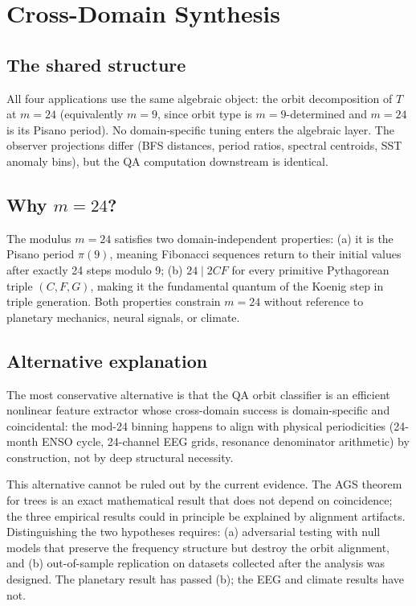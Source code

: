 \documentclass[11pt]{article}
\begin{document}
\section{Cross-Domain Synthesis}\label{sec:synthesis}

\subsection{The shared structure}

All four applications use the same algebraic object: the orbit decomposition
of $T$ at $m=24$ (equivalently $m=9$, since orbit type is $m=9$-determined
and $m=24$ is its Pisano period).  No domain-specific tuning enters the
algebraic layer.  The observer projections differ (BFS distances, period ratios,
spectral centroids, SST anomaly bins), but the QA computation downstream is identical.

\subsection{Why $m = 24$?}

The modulus $m=24$ satisfies two domain-independent properties:
(a) it is the Pisano period $\pi(9)$, meaning Fibonacci sequences
return to their initial values after exactly 24 steps modulo 9;
(b) $24 \mid 2CF$ for every primitive Pythagorean triple $(C,F,G)$,
making it the fundamental quantum of the Koenig step in triple generation.
Both properties constrain $m=24$ without reference to planetary mechanics,
neural signals, or climate.

\subsection{Alternative explanation}

The most conservative alternative is that the QA orbit classifier is an
efficient nonlinear feature extractor whose cross-domain success is
domain-specific and coincidental: the mod-24 binning happens to
align with physical periodicities (24-month ENSO cycle, 24-channel EEG grids,
resonance denominator arithmetic) by construction, not by deep structural necessity.

This alternative cannot be ruled out by the current evidence.
The AGS theorem for trees is an exact mathematical result that does not depend
on coincidence; the three empirical results could in principle be explained
by alignment artifacts.  Distinguishing the two hypotheses requires:
(a) adversarial testing with null models that preserve the frequency structure
but destroy the orbit alignment, and
(b) out-of-sample replication on datasets collected after the analysis was designed.
The planetary result has passed (b); the EEG and climate results have not.
\end{document}
